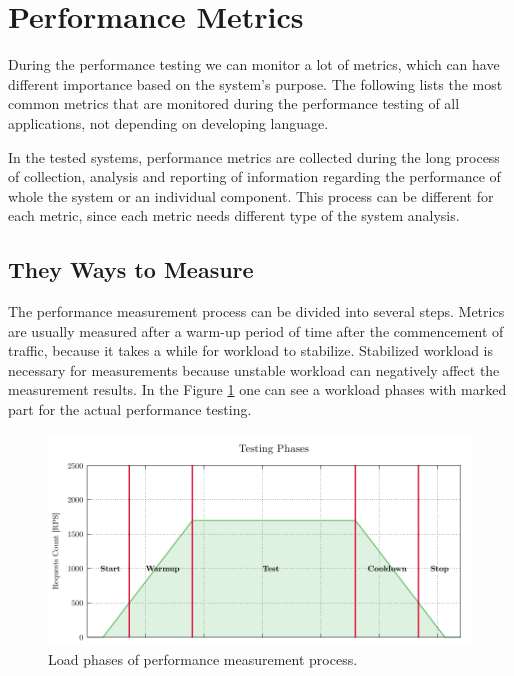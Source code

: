 \section{Performance Metrics}
\label{Performance Metrics}

During the performance testing we can monitor a lot of metrics, which can have different importance based on the system's purpose. The following lists the most common metrics that are monitored during the performance testing of all applications, not depending on developing language.

In the tested systems, performance metrics are collected during the long process of collection, analysis and reporting of information regarding the performance of whole the system or an individual component. This process can be different for each metric, since each metric needs different type of the system analysis.

\subsection*{They Ways to Measure}
The performance measurement process can be divided into several steps. Metrics are usually measured after a warm-up period of time after the commencement of traffic, because it takes a while for workload to stabilize. Stabilized workload is necessary for measurements because unstable workload can negatively affect the measurement results. In the Figure \ref{fig:measurements} one can see a workload phases with marked part for the actual performance testing.

\begin{figure}[H]
  \centering
  \includegraphics[width=15cm]{obrazky-figures/measure_demo.pdf}
  \caption{Load phases of performance measurement process.}
  \label{fig:measurements}
\end{figure}

